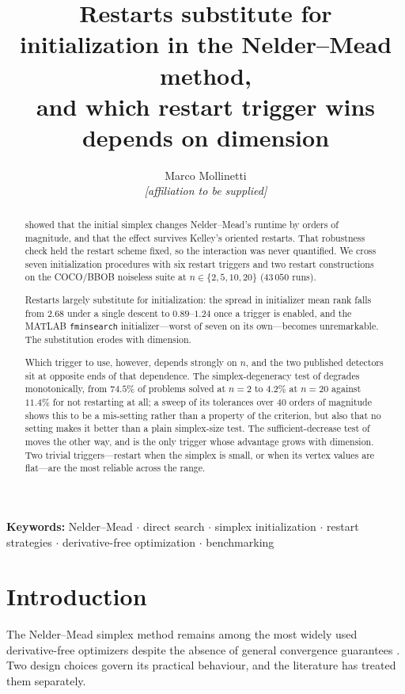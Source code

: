 \documentclass[11pt,a4paper]{article}
\title{Restarts substitute for initialization in the Nelder--Mead method,\\
       and which restart trigger wins depends on dimension}
\author{%
  Marco Mollinetti\\
  \small\textit{[affiliation to be supplied]}
}
\date{}
\begin{document}
\maketitle

\begin{abstract}
\citet{wessing2019} showed that the initial simplex changes Nelder--Mead's
runtime by orders of magnitude, and that the effect survives Kelley's oriented
restarts. That robustness check held the restart scheme fixed, so the
interaction was never quantified. We cross seven initialization procedures with
six restart triggers and two restart constructions on the COCO/BBOB noiseless
suite at $n\in\{2,5,10,20\}$ ($43\,050$ runs).

Restarts largely substitute for initialization: the spread in initializer mean
rank falls from $2.68$ under a single descent to $0.89$--$1.24$ once a trigger is
enabled, and the MATLAB \texttt{fminsearch} initializer---worst of seven on its
own---becomes unremarkable. The substitution erodes with dimension.

Which trigger to use, however, depends strongly on $n$, and the two published
detectors sit at opposite ends of that dependence. The simplex-degeneracy test of
\citet{luersen2004} degrades monotonically, from $74.5\%$ of problems solved at
$n=2$ to $4.2\%$ at $n=20$ against $11.4\%$ for not restarting at all; a sweep of
its tolerances over $40$ orders of magnitude shows this to be a mis-setting
rather than a property of the criterion, but also that no setting makes it better
than a plain simplex-size test. The sufficient-decrease test of \citet{kelley1999}
moves the other way, and is the only trigger whose advantage grows with
dimension. Two trivial triggers---restart when the simplex is small, or when its
vertex values are flat---are the most reliable across the range.
\end{abstract}

\noindent\textbf{Keywords:} Nelder--Mead $\cdot$ direct search $\cdot$ simplex
initialization $\cdot$ restart strategies $\cdot$ derivative-free optimization
$\cdot$ benchmarking

\section{Introduction}

The Nelder--Mead simplex method \citep{nelder1965} remains among the most widely
used derivative-free optimizers despite the absence of general convergence
guarantees \citep{mckinnon1998,lagarias1998}. Two design choices govern its
practical behaviour, and the literature has treated them separately.
\end{document}

